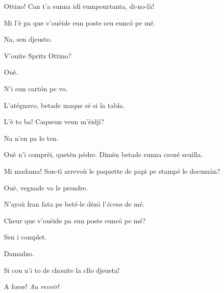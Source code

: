 \begin{drama}
\Richardspeaks Ottino! Can t'a eunna idì eumpourtanta, di-no-là!


\Corrierespeaks{} Mi l'è pa que v'ouèide eun poste seu eunc\'o pe mé.

\Richardspeaks Na, sen djeusto.

\Corrierespeaks{} V'ouite Spritz Ottino?

\Spritzspeaks Ouè.

\Corrierespeaks N'i eun cart\'on pe vo.

\Spritzspeaks L'atégnavo, betade maque sé si la tabla.



\Corrierespeaks{} L'è to ba! Caqueun veun m'èidjì?

\Tcheuttespeaks Na n'en pa lo ten.

\Corrierespeaks Ouè n'i comprèi, quetèn pédre.  Dimèn betade eunna croué seuilla.


\Richardspeaks{} Mi madama! Son-tì arrevoù le paquette de papì pe stampé le documàn?

\Corrierespeaks Ouè, vegnade vo le prendre.


\Richardspeaks N'ayoù fran fata pe beté-le déz\'o l'\textit{écran} de mé.


\Corrierespeaks{}  Cheur que v'ouèide pa eun poste eunc\'o pe mé?

\Saventaspeaks Sen i complet.

\Corrierespeaks Damadzo.

\Sandrinospeaks Si cou n'i to de chouite la cllo djeusta!


\Corrierespeaks A forse! \textit{Au revoir}!



\end{drama}
